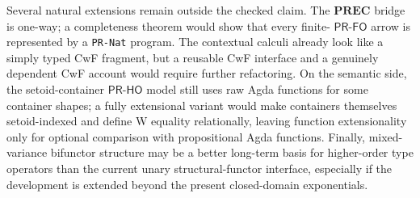 \documentclass[sigplan,10pt,anonymous,review,screen]{acmart}
\newcommand{\PRFO}{\ensuremath{\mathsf{PR\mbox{-}FO}}}
\newcommand{\PRHO}{\ensuremath{\mathsf{PR\mbox{-}HO}}}
\newcommand{\AgdaFile}[1]{\texttt{#1}}
\begin{document}
Several natural extensions remain outside the checked claim.  The
\(\mathbf{PREC}\) bridge is one-way; a completeness theorem would show
that every finite- \PRFO{} arrow is represented by a
\AgdaFile{PR-Nat} program.  The contextual calculi already look like a
simply typed CwF fragment, but a reusable CwF interface and a genuinely
dependent CwF account would require further refactoring.  On the
semantic side, the setoid-container \PRHO{} model still uses raw Agda
functions for some container shapes; a fully extensional variant would
make containers themselves setoid-indexed and define W equality
relationally, leaving function extensionality only for optional
comparison with propositional Agda functions.  Finally, mixed-variance
bifunctor structure may be a better long-term basis for higher-order type
operators than the current unary structural-functor interface, especially
if the development is extended beyond the present closed-domain
exponentials.

\begin{acks}
\end{acks}



\end{document}
